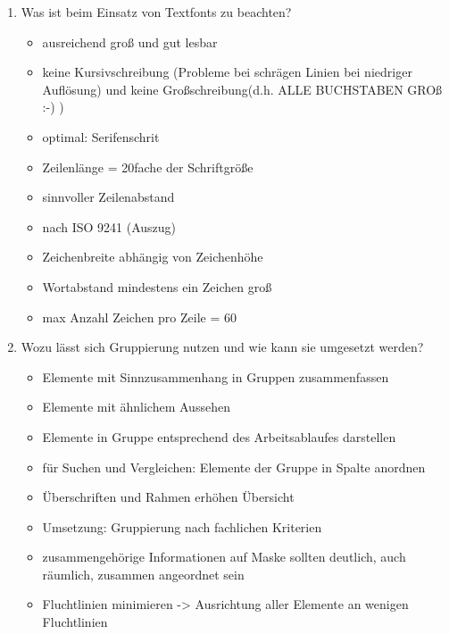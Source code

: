 \begin{enumerate}
	\item Was ist beim Einsatz von Textfonts zu beachten?
	\begin{itemize}
		\item ausreichend groß und gut lesbar
		\item keine Kursivschreibung (Probleme bei schrägen Linien bei niedriger Auflösung) und keine Großschreibung(d.h. ALLE BUCHSTABEN GROß :-) )
		\item optimal: Serifenschrit
		\item Zeilenlänge = 20fache der Schriftgröße
		\item sinnvoller Zeilenabstand
		\item nach ISO 9241 (Auszug)
		\item Zeichenbreite abhängig von Zeichenhöhe
		\item Wortabstand mindestens ein Zeichen groß
		\item max Anzahl Zeichen pro Zeile = 60
	\end{itemize}
	
	\item Wozu lässt sich Gruppierung nutzen und wie kann sie umgesetzt werden?
	\begin{itemize}
		\item Elemente mit Sinnzusammenhang in Gruppen zusammenfassen
		\item Elemente mit ähnlichem Aussehen
		\item Elemente in Gruppe entsprechend des Arbeitsablaufes darstellen
		\item für Suchen und Vergleichen: Elemente der Gruppe in Spalte anordnen
		\item Überschriften und Rahmen erhöhen Übersicht
		\item Umsetzung: Gruppierung nach fachlichen Kriterien
		\item zusammengehörige Informationen auf Maske sollten deutlich, auch räumlich, zusammen angeordnet sein
		\item Fluchtlinien minimieren -> Ausrichtung aller Elemente an wenigen Fluchtlinien
	\end{itemize}
\end{enumerate}

